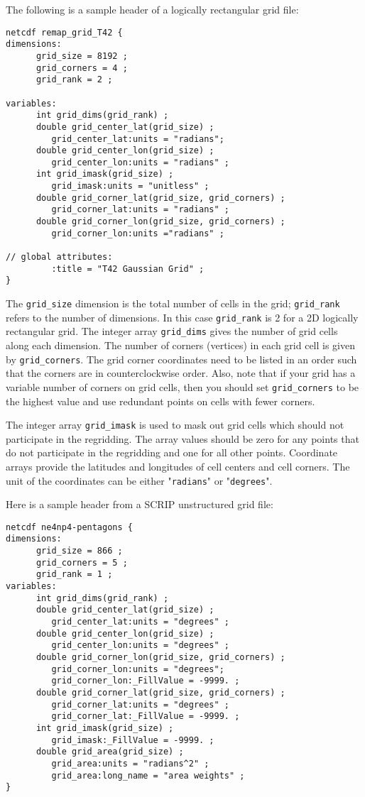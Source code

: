 The following is a sample header of a logically rectangular grid file:

\begin{verbatim}
netcdf remap_grid_T42 {
dimensions:
      grid_size = 8192 ;
      grid_corners = 4 ;
      grid_rank = 2 ;

variables:
      int grid_dims(grid_rank) ;
      double grid_center_lat(grid_size) ;
         grid_center_lat:units = "radians";
      double grid_center_lon(grid_size) ;
         grid_center_lon:units = "radians" ;
      int grid_imask(grid_size) ;
         grid_imask:units = "unitless" ;
      double grid_corner_lat(grid_size, grid_corners) ;
         grid_corner_lat:units = "radians" ;
      double grid_corner_lon(grid_size, grid_corners) ;
         grid_corner_lon:units ="radians" ;

// global attributes:
         :title = "T42 Gaussian Grid" ;
}
\end{verbatim}

The {\tt grid\_size} dimension is the total number of cells in the grid; {\tt grid\_rank} refers to the
number of dimensions. In this case {\tt grid\_rank} is 2 for a 2D logically rectangular grid.
The integer array {\tt grid\_dims} gives the number of grid cells along each dimension.
The number of corners (vertices) in each grid cell is given by {\tt grid\_corners}.
The grid corner coordinates need to be listed in an order such that the corners are in counterclockwise
order.  Also, note that if your grid has a variable number of corners on grid cells, then
you should set {\tt grid\_corners} to be the highest value and use redundant points
on cells with fewer corners.

The integer array {\tt grid\_imask} is used to mask out grid cells which should
not participate in the regridding. The array values should be zero for any points
that do not participate in the regridding and one for all other points.
Coordinate arrays provide the latitudes and longitudes of cell centers
and cell corners. The unit of the coordinates can be either "{\tt radians}" or "{\tt degrees}".

Here is a sample header from a SCRIP unstructured grid file:

\begin{verbatim}
netcdf ne4np4-pentagons {
dimensions:
      grid_size = 866 ;
      grid_corners = 5 ;
      grid_rank = 1 ;
variables:
      int grid_dims(grid_rank) ;
      double grid_center_lat(grid_size) ;
         grid_center_lat:units = "degrees" ;
      double grid_center_lon(grid_size) ;
         grid_center_lon:units = "degrees" ;
      double grid_corner_lon(grid_size, grid_corners) ;
         grid_corner_lon:units = "degrees";
         grid_corner_lon:_FillValue = -9999. ;
      double grid_corner_lat(grid_size, grid_corners) ;
         grid_corner_lat:units = "degrees" ;
         grid_corner_lat:_FillValue = -9999. ;
      int grid_imask(grid_size) ;
         grid_imask:_FillValue = -9999. ;
      double grid_area(grid_size) ;
         grid_area:units = "radians^2" ;
         grid_area:long_name = "area weights" ;
}
\end{verbatim}

